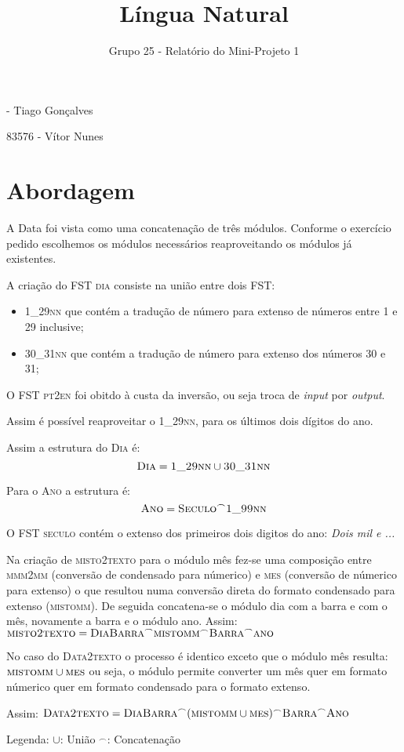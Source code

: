 \documentclass[12pt]{article}
\begin{document}
\title{\vspace{-3cm}Língua Natural}
\author{Grupo 25 - Relatório do Mini-Projeto 1}
\date{}

 - Tiago Gonçalves

83576 - Vítor Nunes

\section*{Abordagem}
A Data foi vista como uma concatenação de três módulos. Conforme o exercício pedido escolhemos os módulos necessários reaproveitando os módulos já existentes.
\newline

A criação do FST \textsc{dia} consiste na união entre dois FST:
\begin{itemize}
	\item \textsc{1{\_}29nn} que contém a tradução de número para extenso de números entre 1 e 29 inclusive;
	\item \textsc{30{\_}31nn} que contém a tradução de número para extenso dos números 30 e 31; \newline
\end{itemize}

O FST \textsc{pt2en} foi obitdo à custa da inversão, ou seja troca de \textit{input} por \textit{output}.

Assim é possível reaproveitar o \textsc{1{\_}29nn}, para os últimos dois dígitos do ano.

Assim a estrutura do \textsc{Dia} é:
$$ \textsc{Dia} = \textsc{1{\_}29nn} \cup \textsc{30{\_}31nn}  $$

Para o \textsc{Ano} a estrutura é:
$$ \textsc{Ano} = \textsc{Seculo} ^\frown \textsc{1{\_}99nn}  $$

O FST \textsc{seculo} contém o extenso dos primeiros dois digitos do ano: \textit{Dois mil e ...} \newline

Na criação de \textsc{misto2texto} para o módulo mês fez-se uma composição entre \textsc{mmm2mm} (conversão de condensado para númerico) e \textsc{mes} (conversão de númerico para extenso) o que resultou numa conversão direta do formato condensado para extenso (\textsc{mistomm}).
De seguida concatena-se o módulo dia com a barra e com o mês, novamente a barra e o módulo ano. \newline
Assim: $\textsc{misto2texto} = \textsc{DiaBarra} ^\frown \textsc{mistomm} ^\frown \textsc{Barra} ^\frown \textsc{ano} \newline$

No caso do \textsc{Data2texto} o processo é identico exceto que o módulo mês resulta: $\textsc{mistomm} \cup \textsc{mes}$ ou seja, o módulo permite converter um mês quer em formato númerico quer em formato condensado para o formato extenso.

Assim: $\textsc{Data2texto} = \textsc{DiaBarra} ^\frown (\textsc{mistomm} \cup \textsc{mes}) ^\frown \textsc{Barra} ^\frown \textsc{Ano} \newline$


Legenda: $\cup$: União $^\frown$: Concatenação
\end{document}
